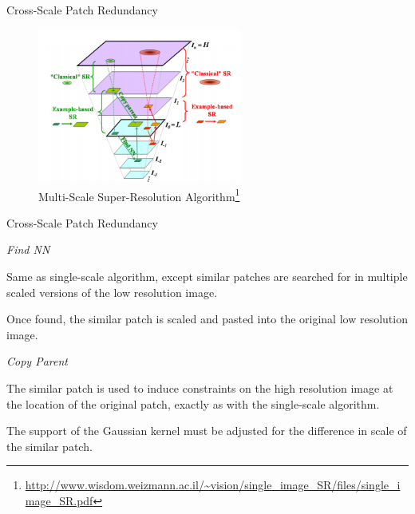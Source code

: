 \documentclass{beamer}
\begin{document}
\begin{frame}[fragile]{Cross-Scale Patch Redundancy}

\begin{figure}
\centering
\includegraphics[width=0.6\textwidth]{cross-scale-1.png}
\caption{Multi-Scale Super-Resolution Algorithm\footnote[1]{\url{http://www.wisdom.weizmann.ac.il/~vision/single_image_SR/files/single_image_SR.pdf}}}
\end{figure}

\end{frame}


\begin{frame}[fragile]{Cross-Scale Patch Redundancy}

\emph{\Large{Find NN}}

\normalsize

Same as single-scale algorithm, except similar patches are searched for in multiple scaled versions of the low resolution image.

\vspace{0.2cm}

Once found, the similar patch is scaled and pasted into the original low resolution image.

\vspace{0.4cm}

\emph{\Large{Copy Parent}}

\normalsize

The similar patch is used to induce constraints on the high resolution image at the location of the original patch, exactly as with the single-scale algorithm.

\vspace{0.2cm}

The support of the Gaussian kernel must be adjusted for the difference in scale of the similar patch.


\end{frame}

\end{document}

